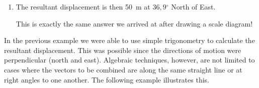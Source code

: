 {\begin{mdframed}[linewidth=4, leftmargin=40, rightmargin=40]
\begin{exercise}
\begin{enumerate}[noitemsep, label=\textbf{Step} \textbf{\arabic*}. ]
{\begin{equation}
      \end{equation}
    }{%
    \setlength{\mymathboxwidth}{\columnwidth}
      \addtolength{\mymathboxwidth}{-48pt}
    \par\vspace{12pt}\noindent\begin{minipage}{\columnwidth}
    \parbox[t]{\mymathboxwidth}{\large\begin{math}
    tan\alpha =\frac{\mathrm{opposite\; side}}{\mathrm{adjacent\; side}}tan\alpha =\frac{30}{40}\alpha ={tan}^{-1}\left(0,75\right)\alpha =36,{9}^{\circ }\end{math}}\hfill
    \parbox[t]{48pt}{\raggedleft 
    (19.10)}
    \end{minipage}\vspace{12pt}\par
    }%
    
          
          \item  
          \label{m38816*id192009}The resultant displacement is then 50~m at \begin{math}36,9{}^{\circ }\end{math} North of East.\par 
          \label{m38816*id192027}This is exactly the same answer we arrived at after drawing a scale diagram! \par 
          \end{enumerate}
         

    \end{exercise}
    \end{mdframed}
    }
    \noindent
  
          \label{m38816*id192042}In the previous example we were able to use simple trigonometry to
calculate the resultant displacement. This was possible since the
directions of motion were perpendicular (north and east).
Algebraic techniques, however, are not limited to cases where the vectors to be combined are along the same straight line or at right angles to one
another. The following example illustrates this.\par 
\label{m38816*secfhsst!!!underscore!!!id1676}\vspace{.5cm} 
      
